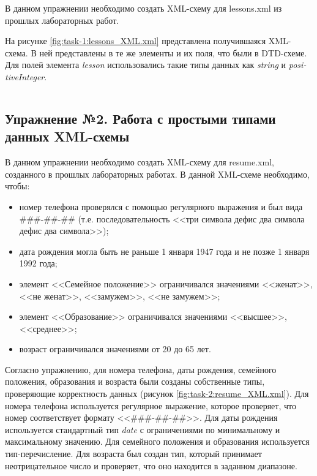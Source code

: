 \documentclass[a4paper, 14pt]{extarticle}
\begin{document}
В данном упражнении необходимо создать XML-схему для
\foreignlanguage{english}{lessons.xml} из прошлых лабораторных работ.

На рисунке \ref{fig:task-1:lessons_XML.xml} представлена получившаяся XML-схема.
В ней представлены в те же элементы и их поля, что были в DTD-схеме. Для полей
элемента \textit{\foreignlanguage{english}{lesson}} использовались такие типы
данных как \textit{\foreignlanguage{english}{string}} и
\textit{\foreignlanguage{english}{positiveInteger}}.

\vspace*{2em}

\bgroup
\inputminted{xml}{../code/task-1/lessons_XML.xml}
\label{fig:task-1:lessons_XML.xml}
\egroup

\subsection*{Упражнение №2. Работа с простыми типами данных XML-схемы}

В данном упражнении необходимо создать XML-схему для
\foreignlanguage{english}{resume.xml}, созданного в прошлых лабораторных
работах. В данной XML-схеме необходимо, чтобы:
\begin{itemize}
  \item номер телефона проверялся с помощью регулярного выражения и был вида
  \#\#\#-\#\#-\#\# (т.е. последовательность <<три символа дефис два символа
  дефис два символа>>);
  \item дата рождения могла быть не раньше 1 января 1947 года и не позже 1
  января 1992 года;
  \item элемент <<Семейное положение>> ограничивался значениями <<женат>>, <<не
  женат>>, <<замужем>>, <<не замужем>>;
  \item элемент <<Образование>> ограничивался значениями <<высшее>>,
  <<среднее>>;
  \item возраст ограничивался значениями от 20 до 65 лет.
\end{itemize}

Согласно упражнению, для номера телефона, даты рождения, семейного положения,
образования и возраста были созданы собственные типы, проверяющие корректность
данных (рисунок \ref{fig:task-2:resume_XML.xml}). Для номера телефона
используется регулярное выражение, которое проверяет, что номер соответствует
формату <<\#\#\#-\#\#-\#\#>>. Для даты рождения используется стандартный тип
\textit{\foreignlanguage{english}{date}} с ограничениями по минимальному и
максимальному значению. Для семейного положения и образования используется
тип-перечисление. Для возраста был создан тип, который принимает неотрицательное
число и проверяет, что оно находится в заданном диапазоне.
\end{document}
